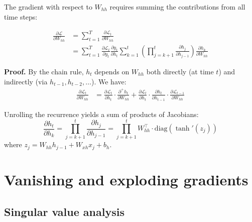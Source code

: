 The gradient with respect to $W_{hh}$ requires summing the contributions
from all time steps:

\begin{theorem}
\begin{align}
\frac{\partial \mathcal{L}}{\partial W_{hh}}
&= \sum_{t=1}^T \frac{\partial \mathcal{L}_t}{\partial W_{hh}} \nonumber \\
&= \sum_{t=1}^T \frac{\partial \mathcal{L}_t}{\partial y_t}
   \frac{\partial y_t}{\partial h_t}
   \sum_{k=1}^{t} \left(\prod_{j=k+1}^{t}
   \frac{\partial h_j}{\partial h_{j-1}}\right)
   \frac{\partial h_k}{\partial W_{hh}}
\label{eq:bptt-whh}
\end{align}
\end{theorem}

\textbf{Proof.}
By the chain rule, $h_t$ depends on $W_{hh}$ both directly (at time $t$)
and indirectly (via $h_{t-1}, h_{t-2}, \ldots$). We have:
\begin{align}
\frac{\partial \mathcal{L}_t}{\partial W_{hh}}
&= \frac{\partial \mathcal{L}_t}{\partial h_t}
   \cdot \frac{\partial^+ h_t}{\partial W_{hh}}
   + \frac{\partial \mathcal{L}_t}{\partial h_t}
   \cdot \frac{\partial h_t}{\partial h_{t-1}}
   \cdot \frac{\partial \mathcal{L}_{t-1}}{\partial W_{hh}}
\end{align}

Unrolling the recurrence yields a sum of products of Jacobians:
\begin{equation}
\frac{\partial h_t}{\partial h_k}
= \prod_{j=k+1}^{t} \frac{\partial h_j}{\partial h_{j-1}}
= \prod_{j=k+1}^{t} W_{hh}^\top \cdot \text{diag}(\tanh'(z_j))
\label{eq:jacobian-product}
\end{equation}
where $z_j = W_{hh} h_{j-1} + W_{xh} x_j + b_h$.

\section{Vanishing and exploding gradients}
\label{sec:vanishing-exploding}

\subsection{Singular value analysis}

